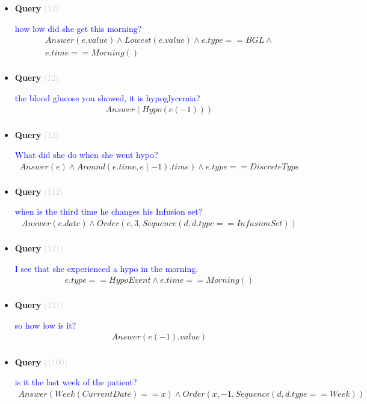 \documentclass[11pt]{article}
\newcommand{\key}[1]{\textcolor{lightgray}{#1}}
\newcounter{CQuery}
\begin{document}
\begin{itemize}
\item
\textbf{Query\theCQuery} \key{(12)} \addtocounter{CQuery}{1}
\textcolor{blue}{ how low did she get this morning? }
\begin{multline*}
Answer(e.value) \wedge Lowest(e.value) \wedge e.type==BGL \wedge \\ 
e.time==Morning() \\ 
\end{multline*}


\item
\textbf{Query\theCQuery} \key{(12)} \addtocounter{CQuery}{1}
\textcolor{blue}{ the blood glucose you showed, it is hypoglycemia? }
\begin{multline*}
Answer(Hypo(e(-1))) \\ 
\end{multline*}


\item
\textbf{Query\theCQuery} \key{(12)} \addtocounter{CQuery}{1}
\textcolor{blue}{ What did she do when she went hypo? }
\begin{multline*}
Answer(e) \wedge Around(e.time, e(-1).time) \wedge e.type==DiscreteType \\ 
\end{multline*}


\item
\textbf{Query\theCQuery} \key{(112)} \addtocounter{CQuery}{1}
\textcolor{blue}{ when is the third time he changes his Infusion set? }
\begin{multline*}
Answer(e.date) \wedge Order(e, 3, Sequence(d, d.type==InfusionSet)) \\ 
\end{multline*}


\item
\textbf{Query\theCQuery} \key{(121)} \addtocounter{CQuery}{1}
\textcolor{blue}{ I see that she experienced a hypo in the morning. }
\begin{multline*}
e.type==HypoEvent \wedge e.time==Morning() \\ 
\end{multline*}


\item
\textbf{Query\theCQuery} \key{(121)} \addtocounter{CQuery}{1}
\textcolor{blue}{ so how low is it? }
\begin{multline*}
Answer(e(-1).value) \\ 
\end{multline*}


\item
\textbf{Query\theCQuery} \key{(1100)} \addtocounter{CQuery}{1}
\textcolor{blue}{ is it the last week of the patient? }
\begin{multline*}
Answer(Week(CurrentDate)==x) \wedge Order(x, -1, Sequence(d, d.type==Week)) \\ 
\end{multline*}



\end{itemize}
\end{document}
